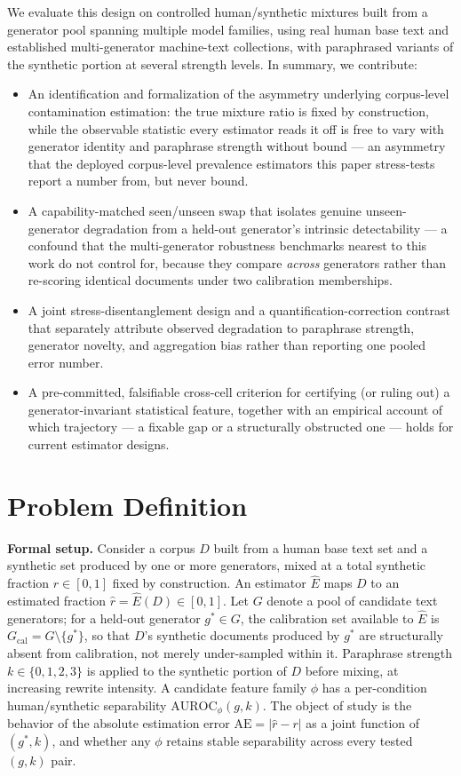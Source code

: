 \documentclass[11pt]{article}
\begin{document}
We evaluate this design on controlled human/synthetic mixtures built from a generator pool spanning multiple model families, using real human base text and established multi-generator machine-text collections, with paraphrased variants of the synthetic portion at several strength levels. In summary, we contribute:
\begin{itemize}[leftmargin=1.4em]
\item An identification and formalization of the asymmetry underlying corpus-level contamination estimation: the true mixture ratio is fixed by construction, while the observable statistic every estimator reads it off is free to vary with generator identity and paraphrase strength without bound --- an asymmetry that the deployed corpus-level prevalence estimators this paper stress-tests \citep{MonitoringAIContent2024} report a number from, but never bound.
\item A capability-matched seen/unseen swap that isolates genuine unseen-generator degradation from a held-out generator's intrinsic detectability --- a confound that the multi-generator robustness benchmarks nearest to this work \citep{RAID2024Benchmark,MAGE2024InTheWild} do not control for, because they compare \emph{across} generators rather than re-scoring identical documents under two calibration memberships.
\item A joint stress-disentanglement design and a quantification-correction contrast that separately attribute observed degradation to paraphrase strength, generator novelty, and aggregation bias rather than reporting one pooled error number.
\item A pre-committed, falsifiable cross-cell criterion for certifying (or ruling out) a generator-invariant statistical feature, together with an empirical account of which trajectory --- a fixable gap or a structurally obstructed one --- holds for current estimator designs.
\end{itemize}

\section{Problem Definition}

\noindent\textbf{Formal setup.} Consider a corpus $D$ built from a human base text set and a synthetic set produced by one or more generators, mixed at a total synthetic fraction $r \in [0,1]$ fixed by construction. An estimator $\hat{E}$ maps $D$ to an estimated fraction $\hat{r} = \hat{E}(D) \in [0,1]$. Let $G$ denote a pool of candidate text generators; for a held-out generator $g^* \in G$, the calibration set available to $\hat{E}$ is $G_{\text{cal}} = G \setminus \{g^*\}$, so that $D$'s synthetic documents produced by $g^*$ are structurally absent from calibration, not merely under-sampled within it. Paraphrase strength $k \in \{0,1,2,3\}$ is applied to the synthetic portion of $D$ before mixing, at increasing rewrite intensity. A candidate feature family $\phi$ has a per-condition human/synthetic separability $\mathrm{AUROC}_\phi(g,k)$. The object of study is the behavior of the absolute estimation error $\mathrm{AE} = |\hat{r} - r|$ as a joint function of $(g^*, k)$, and whether any $\phi$ retains stable separability across every tested $(g,k)$ pair.
\end{document}
